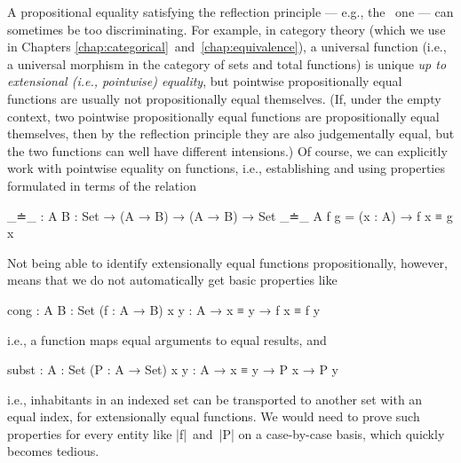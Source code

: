 A propositional equality satisfying the reflection principle --- e.g., the \Agda\ one --- can sometimes be too discriminating.
For example, in category theory (which we use in Chapters \ref{chap:categorical}~and~\ref{chap:equivalence}), a universal function (i.e., a universal morphism in the category of sets and total functions) is unique \emph{up to extensional (i.e., pointwise) equality}, but pointwise propositionally equal functions are usually not propositionally equal themselves.
(If, under the empty context, two pointwise propositionally equal functions are propositionally equal themselves, then by the reflection principle they are also judgementally equal, but the two functions can well have different intensions.)
Of course, we can explicitly work with pointwise equality on functions, i.e., establishing and using properties formulated in terms of the relation
\begin{code}
_≐_ : {A B : Set} → (A → B) → (A → B) → Set
_≐_ {A} f g = (x : A) → f x ≡ g x
\end{code}
Not being able to identify extensionally equal functions propositionally, however, means that we do not automatically get basic properties like
\begin{code}
cong : {A B : Set} (f : A → B) {x y : A} → x ≡ y → f x ≡ f y
\end{code}
i.e., a function maps equal arguments to equal results, and
\begin{code}
subst : {A : Set} (P : A → Set) {x y : A} → x ≡ y → P x → P y
\end{code}
i.e., inhabitants in an indexed set can be transported to another set with an equal index, for extensionally equal functions.
We would need to prove such properties for every entity like |f|~and~|P| on a case-by-case basis, which quickly becomes tedious.

